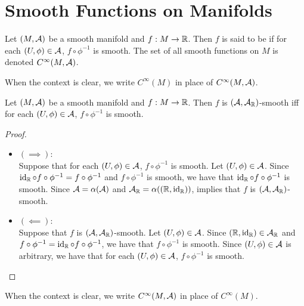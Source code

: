 \documentclass{book}
\begin{document}
\newpage
\section{Smooth Functions on Manifolds}	

\begin{defn}  
	Let $(M, \mathcal{A})$ be a smooth manifold and $f: M \rightarrow \mathbb{R}$. Then $f$ is said to be  if for each $(U, \phi) \in \mathcal{A}$, $f \circ \phi^{-1}$ is smooth. The set of all smooth functions on $M$ is denoted $C^{\infty}(M, \mathcal{A})$.
\end{defn}

\begin{note}
	When the context is clear, we write $C^{\infty}(M)$ in place of $C^{\infty}(M, \mathcal{A})$.
\end{note}

\begin{ex}  
	Let $(M, \mathcal{A})$ be a smooth manifold and $f: M \rightarrow \mathbb{R}$. Then $f$ is $(\mathcal{A}, \mathcal{A}_{\mathbb{R}})$-smooth iff for each $(U, \phi) \in \mathcal{A}$, $f \circ \phi^{-1}$ is smooth.
\end{ex}

\begin{proof}\
	\begin{itemize}
		\item $(\implies)$: \\
		Suppose that for each $(U, \phi) \in \mathcal{A}$, $f \circ \phi^{-1}$ is smooth. Let $(U, \phi) \in \mathcal{A}$. Since $\operatorname{id}_{\mathbb{R}} \circ f \circ \phi^{-1} = f \circ \phi^{-1}$ and $f \circ \phi^{-1}$ is smooth, we have that $\operatorname{id}_{\mathbb{R}} \circ f \circ \phi^{-1}$ is smooth. Since $\mathcal{A} = \alpha(\mathcal{A})$ and $\mathcal{A}_{\mathbb{R}} = \alpha((\mathbb{R}, \operatorname{id}_{\mathbb{R}}))$,  implies that $f$ is $(\mathcal{A}, \mathcal{A}_{\mathbb{R}})$-smooth.
		\item $(\impliedby)$: \\
		Suppose that $f$ is $(\mathcal{A}, \mathcal{A}_{\mathbb{R}})$-smooth. Let $(U, \phi) \in \mathcal{A}$. Since $(\mathbb{R}, \operatorname{id}_{\mathbb{R}}) \in \mathcal{A}_{\mathbb{R}}$ and $f \circ \phi^{-1} = \operatorname{id}_{\mathbb{R}} \circ f \circ \phi^{-1}$, we have that $f \circ \phi^{-1}$ is smooth. Since $(U, \phi) \in \mathcal{A}$ is arbitrary, we have that for each $(U, \phi) \in \mathcal{A}$, $f \circ \phi^{-1}$ is smooth.
	\end{itemize}
\end{proof}

\begin{note}
	When the context is clear, we write $C^{\infty}(M, \mathcal{A})$ in place of $C^{\infty}(M)$.
\end{note}
\end{document}
